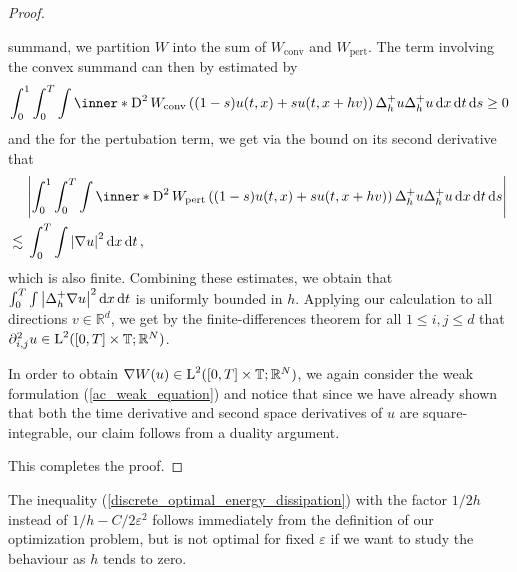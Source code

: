 \begin{proof}
\begin{description}[wide=0pt]
		summand, we partition $ W $ into the sum of $ W_{ \mathrm{conv} } $ and 
		$ W_{ \mathrm{pert} } $. The term involving the convex summand can then 
		by estimated by
		\begin{equation*}
			\int_{ 0 }^{ 1 }
			\int_{ 0 }^{ T }
			\int
			\inner*{ 
				\diff^{ 2 } W_{ \mathrm{conv} } \left( ( 1- s ) u ( t, x  ) + s u( t,  x + h v ) \right) 
				\Delta_{ h }^{ + } u
			}{
				\Delta_{ h }^{ + } u 
			}
			\dd{ x }
			\dd{ t }
			\dd{ s }
			\geq 0 
		\end{equation*}
		and the for the pertubation term, we get via the bound on its second derivative that
		\begin{align*}
			& \abs{
				\int_{ 0 }^{ 1 }
				\int_{ 0 }^{ T }
				\int
				\inner*{ 
					\diff^{ 2 } W_{ \mathrm{pert} } \left( (1 - s ) u ( t, x  ) + s  u( t,  x + h v )  \right) 
					\Delta_{ h }^{ + } u
				}{
					\Delta_{ h }^{ + } u 
				}
				\dd{ x }
				\dd{ t }
				\dd{ s }
			}
			\\
			\lesssim {} &
			\int_{ 0 }^{ T }
			\int
			\abs{ \nabla u }^{ 2 }
			\dd{ x }
			\dd{ t },
		\end{align*}
		which is also finite. 
		Combining these estimates, we obtain that $ \int_{ 0 }^{ T } \int \abs{ \Delta_{ h }^{ + } \nabla u }^{ 2 } \dd{ x } \dd{ t } $ is uniformly bounded in $ h $. Applying our calculation to all directions $ v \in \mathbb{ R }^{ d } $, we get by the finite-differences theorem for all $ 1 \leq i, j \leq d $ that $ \partial_{ i , j }^{ 2 } u \in \operatorname{L}^{ 2 } ( [ 0 , T ] \times \operatorname{\mathbb{T}} ; \mathbb{ R }^{ N } ) $.
		
		In order to obtain $ \nabla W ( u ) \in \operatorname{L}^{ 2 } ( [ 0 , T ] \times \operatorname{\mathbb{T}} ; \mathbb{ R }^{ N } ) $, we again consider the weak formulation (\ref{ac_weak_equation}) and notice that since we have already shown that both the time derivative and second space derivatives of $ u $ are square-integrable, our claim follows from a duality argument. 
	\end{description}
	This completes the proof.
\end{proof}

\begin{remark}
	The inequality (\ref{discrete_optimal_energy_dissipation}) with the factor 
	$ 1/2h $ instead of $ 1/h- C/2\varepsilon^{ 2 } $ follows immediately from 
	the definition of our optimization problem, but is not optimal for fixed $ 
	\varepsilon $ if we want to study the behaviour as $ h $ tends to zero.
\end{remark}

